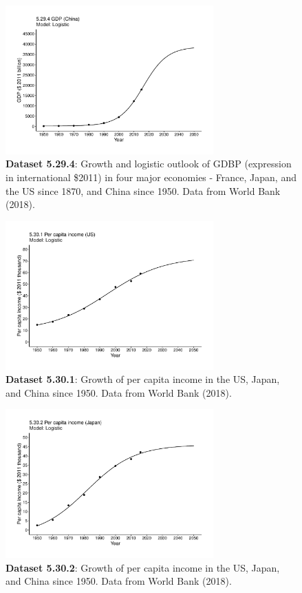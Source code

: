 \documentclass[aps,rmp,preprint,superscriptaddress,10pt,onecolumn]{article}
\begin{document}
\begin{figure}[h]
\includegraphics[width=8cm]{output/figs-ggplot/5.29.4.pdf}
\caption{\textbf{Dataset 5.29.4}: Growth and logistic outlook of GDBP (expression in international \$2011) in four major economies - France, Japan, and the US since 1870, and China since 1950. Data from World Bank (2018).}
\end{figure}
	
\begin{figure}[h]
\includegraphics[width=8cm]{output/figs-ggplot/5.30.1.pdf}
\caption{\textbf{Dataset 5.30.1}: Growth of per capita income in the US, Japan, and China since 1950. Data from World Bank (2018).}
\end{figure}
	
\begin{figure}[h]
\includegraphics[width=8cm]{output/figs-ggplot/5.30.2.pdf}
\caption{\textbf{Dataset 5.30.2}: Growth of per capita income in the US, Japan, and China since 1950. Data from World Bank (2018).}
\end{figure}
	
\end{document}
